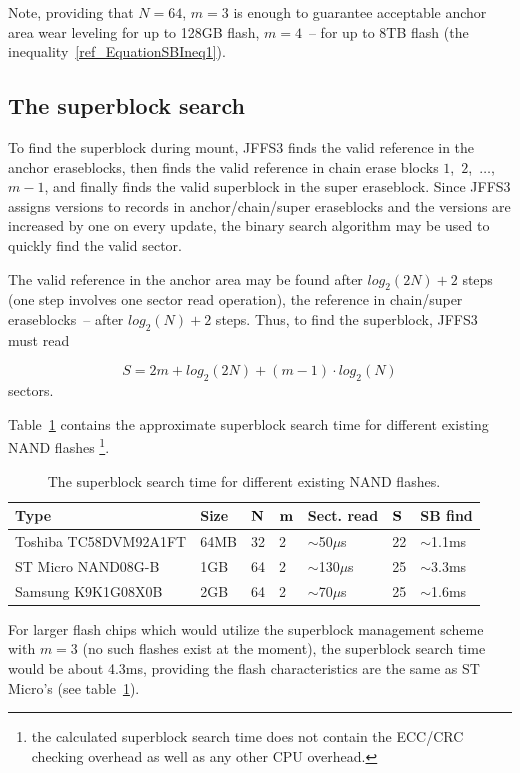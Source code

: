 Note, providing that $N=64$, $m=3$ is enough to guarantee acceptable anchor
area wear leveling for up to 128GB flash, $m=4$~-- for up to 8TB flash (the
inequality~\ref{ref_EquationSBIneq1}).

%
%
\subsection{The superblock search}

To find the superblock during mount, JFFS3 finds the valid reference in the
anchor eraseblocks, then finds the valid reference in chain erase blocks
$1$,~$2$,~$\ldots$,~$m-1$, and finally finds the valid superblock in the super
eraseblock. Since JFFS3 assigns versions to records in anchor/chain/super
eraseblocks and the versions are increased by one on every update, the binary
search algorithm may be used to quickly find the valid sector.

The valid reference in the anchor area may be found after $log_2(2N)+2$ steps
(one step involves one sector read operation), the reference in chain/super
eraseblocks~-- after $log_2(N)+2$ steps. Thus, to find the superblock, JFFS3
must read

$$
S = 2m + log_2(2N) + (m - 1) \cdot log_2(N)
$$
sectors.

Table~\ref{ref_TableNANDTimes} contains the approximate superblock search time
for different existing NAND flashes
\footnote{the calculated superblock search time does not contain the ECC/CRC
checking overhead as well as any other CPU overhead.}.

\begin{table}[h]
\begin{center}
\begin{tabular}{lllllll}
\textbf{Type} & \textbf{Size} & $\bf N$ & $\bf m$ & \textbf{Sect. read} & $\bf
S$ & \textbf{SB find}\\
\hline
Toshiba TC58DVM92A1FT & 64MB & 32 & 2 & $\sim$50$\mu$s  & 22 & $\sim$1.1ms\\
ST Micro NAND08G-B    & 1GB  & 64 & 2 & $\sim$130$\mu$s & 25 & $\sim$3.3ms\\
Samsung K9K1G08X0B    & 2GB  & 64 & 2 & $\sim$70$\mu$s  & 25 & $\sim$1.6ms\\
\end{tabular}
\caption{The superblock search time for different existing NAND flashes.}
\label{ref_TableNANDTimes}
\end{center}
\end{table}

For larger flash chips which would utilize the superblock management scheme
with $m = 3$ (no such flashes exist at the moment), the superblock search time
would be about 4.3ms, providing the flash characteristics are the same as ST
Micro's (see table~\ref{ref_TableNANDTimes}).

